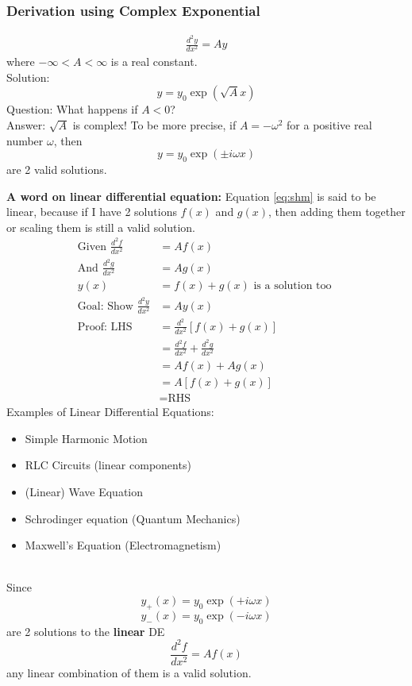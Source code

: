 \documentclass{article}
\begin{document}
\subsubsection{Derivation using Complex Exponential }
\begin{align}
    \frac{d^2 y}{ dx^2} = A y     \label{eq:shm}
\end{align}
where $-\infty < A < \infty$ is a real constant.\\[10pt]
Solution: $$y=y_0 \exp(\sqrt{A}x)$$ 
Question: What happens if $A < 0$? \\
Answer: $\sqrt{A}$ is complex! To be more precise, if $A=-\omega^2$ for a positive real number $\omega$, then 
$$y=y_0 \exp(\pm i \omega x)$$
are 2 valid solutions.

\textbf{A word on linear differential equation: } Equation \ref{eq:shm} is said to be linear, because if I have 2 solutions $f(x)$ and $g(x)$, then adding them together or scaling them is still a valid solution.
\begin{align}
    \text{Given } \frac{d^2 f}{ dx^2} &= A f(x)\\
    \text{And } \frac{d^2 g}{ dx^2} &= A g(x) \\
    y(x) &= f(x) + g(x)\text{ is a solution too }\\
    \text{Goal: Show } \frac{d^2y}{dx^2} & = Ay(x)\\
    \text{Proof: LHS} &= \frac{d^2}{dx^2} [f(x)+g(x)] \\
    &= \frac{d^2 f}{dx^2} + \frac{d^2 g}{dx^2} \\ 
    &= A f(x) + A g(x) \\
    &= A [f(x) + g(x)] \\
    &= \text{RHS}
\end{align}
Examples of Linear Differential Equations:
\begin{itemize}
    \item Simple Harmonic Motion
    \item RLC Circuits (linear components)
    \item (Linear) Wave Equation
    \item Schrodinger equation (Quantum Mechanics)
    \item Maxwell's Equation (Electromagnetism)
\end{itemize}
\leavevmode \\
Since $$y_+(x)=y_0 \exp(+ i \omega x)$$  $$y_-(x) = y_0 \exp(- i \omega x)$$ are 2 solutions to the \textbf{linear} DE $$\frac{d^2 f}{ dx^2} = A f(x)$$
any linear combination of them is a valid solution.
\end{document}
